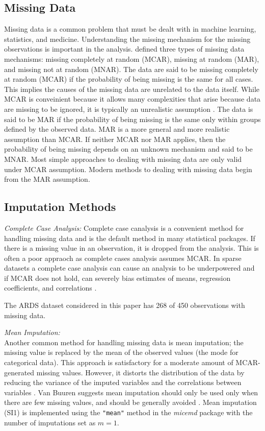 \documentclass[12pt,]{article}
\begin{document}
\subsection{Missing Data}\label{missing-data}

Missing data is a common problem that must be dealt with in machine
learning, statistics, and medicine. Understanding the missing mechanism
for the missing observations is important in the analysis.
\autocite{rubin_inference_1976} defined three types of missing data
mechanisms: missing completely at random (MCAR), missing at random
(MAR), and missing not at random (MNAR). The data are said to be missing
completely at random (MCAR) if the probability of being missing is the
same for all cases. This implies the causes of the missing data are
unrelated to the data itself. While MCAR is conveinient because it
allows many complexities that arise because data are missing to be
ignored, it is typically an unrealistic assumption
\autocite{van_buuren_flexible_2012}. The data is said to be MAR if the
probability of being missing is the same only within groups defined by
the observed data. MAR is a more general and more realistic assumption
than MCAR. If neither MCAR nor MAR applies, then the probability of
being missing depends on an unknown mechanism and said to be MNAR. Most
simple approaches to dealing with missing data are only valid under MCAR
assumption. Modern methods to dealing with missing data begin from the
MAR assumption.

\subsection{Imputation Methods}\label{imputation-methods}

\emph{Complete Case Analysis:} Complete case canalysis is a convenient
method for handling missing data and is the default method in many
statistical packages. If there is a missing value in an observation, it
is dropped from the analysis. This is often a poor appraoch as complete
cases analysis assumes MCAR. In sparse datasets a complete case analysis
can cause an analysis to be underpowered and if MCAR does not hold, can
severely bias estimates of means, regression coefficients, and
correlations \autocite{van_buuren_flexible_2012}.

The ARDS dataset considered in this paper has 268 of 450 observations
with missing data.

\emph{Mean Imputation:}\\
Another common method for handling missing data is mean imputation; the
missing value is replaced by the mean of the observed values (the mode
for categorical data). This approach is satisfactory for a moderate
amount of MCAR-generated missing values. However, it distorts the
distribution of the data by reducing the variance of the imputed
variables and the correlations between variables
\autocite{little_bayes_2014}. Van Buuren suggests mean imputation should
only be used only when there are few missing values, and should be
generally avoided \autocite{van_buuren_flexible_2012}. Mean imputation
(SI1) is implemented using the \texttt{"mean"} method in the
\emph{micemd} package with the number of imputations set as \(m=1\).
\end{document}
